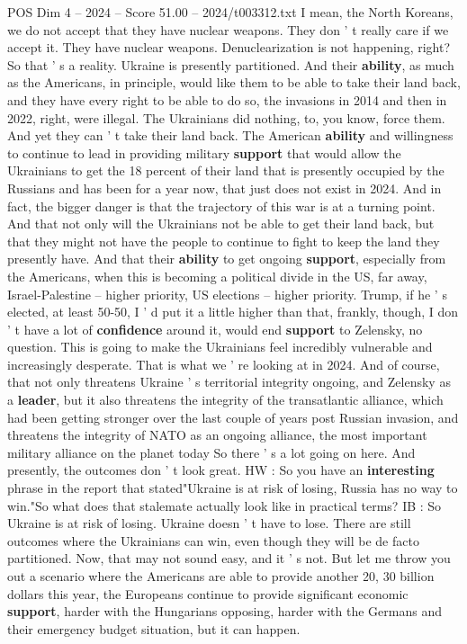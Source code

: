\begin{textsample}{POS Dim 4 – 2024 – Score 51.00 – 2024/t003312.txt}
I mean, the North Koreans, we do not accept that they have nuclear weapons.
They don ' t really care if we accept it.
They have nuclear weapons.
Denuclearization is not happening, right?
So that ' s a reality.
Ukraine is presently partitioned.
And their \textbf{ability}, as much as the Americans, in principle, would like them to be able to take their land back, and they have every right to be able to do so, the invasions in 2014 and then in 2022, right, were illegal.
The Ukrainians did nothing, to, you know, force them.
And yet they can ' t take their land back.
The American \textbf{ability} and willingness to continue to lead in providing military \textbf{support} that would allow the Ukrainians to get the 18 percent of their land that is presently occupied by the Russians and has been for a year now, that just does not exist in 2024.
And in fact, the bigger danger is that the trajectory of this war is at a turning point.
And that not only will the Ukrainians not be able to get their land back, but that they might not have the people to continue to fight to keep the land they presently have.
And that their \textbf{ability} to get ongoing \textbf{support}, especially from the Americans, when this is becoming a political divide in the US, far away, Israel-Palestine -- higher priority, US elections -- higher priority.
Trump, if he ' s elected, at least 50-50, I ' d put it a little higher than that, frankly, though, I don ' t have a lot of \textbf{confidence} around it, would end \textbf{support} to Zelensky, no question.
This is going to make the Ukrainians feel incredibly vulnerable and increasingly desperate.
That is what we ' re looking at in 2024.
And of course, that not only threatens Ukraine ' s territorial integrity ongoing, and Zelensky as a \textbf{leader}, but it also threatens the integrity of the transatlantic alliance, which had been getting stronger over the last couple of years post Russian invasion, and threatens the integrity of NATO as an ongoing alliance, the most important military alliance on the planet today So there ' s a lot going on here.
And presently, the outcomes don ' t look great.
HW : So you have an \textbf{interesting} phrase in the report that stated"Ukraine is at risk of losing, Russia has no way to win."So what does that stalemate actually look like in practical terms?
IB : So Ukraine is at risk of losing.
Ukraine doesn ' t have to lose.
There are still outcomes where the Ukrainians can win, even though they will be de facto partitioned.
Now, that may not sound easy, and it ' s not.
But let me throw you out a scenario where the Americans are able to provide another 20, 30 billion dollars this year, the Europeans continue to provide significant economic \textbf{support}, harder with the Hungarians opposing, harder with the Germans and their emergency budget situation, but it can happen.

\end{textsample}
